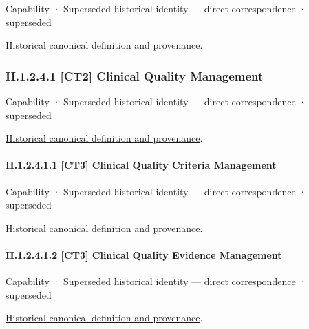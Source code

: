 \label{element:b967c383dbcd4c24abe6a83ea5e79e00}
{\small Capability · Superseded historical identity — direct correspondence · superseded}\par
\href{../../../../continuum/strategy/capability/b967c383dbcd4c24abe6a83ea5e79e00.md}{Historical canonical definition and provenance}.\par
\subsubsection*{II.1.2.4.1 [CT2] Clinical Quality Management}
\label{navigation:II.1.2.4.1}

\label{element:dc1bece79eb7452e951d03a2ee6dfaa6}
{\small Capability · Superseded historical identity — direct correspondence · superseded}\par
\href{../../../../continuum/strategy/capability/dc1bece79eb7452e951d03a2ee6dfaa6.md}{Historical canonical definition and provenance}.\par
\paragraph*{II.1.2.4.1.1 [CT3] Clinical Quality Criteria Management}
\label{navigation:II.1.2.4.1.1}

\label{element:7a51321b00464016920976b269981edd}
{\small Capability · Superseded historical identity — direct correspondence · superseded}\par
\href{../../../../continuum/strategy/capability/7a51321b00464016920976b269981edd.md}{Historical canonical definition and provenance}.\par
\paragraph*{II.1.2.4.1.2 [CT3] Clinical Quality Evidence Management}
\label{navigation:II.1.2.4.1.2}

\label{element:f31902d474894670aeef3e0abbedccf0}
{\small Capability · Superseded historical identity — direct correspondence · superseded}\par
\href{../../../../continuum/strategy/capability/f31902d474894670aeef3e0abbedccf0.md}{Historical canonical definition and provenance}.\par
